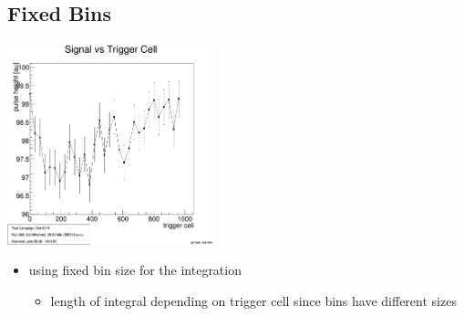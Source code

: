 \documentclass[9pt]{beamer}
\begin{document}
\subsection{Fixed Bins}
\begin{frame}
	\begin{center}
		\includegraphics[width=6cm]{SignalVsTriggerCell}
	\end{center}
	\begin{itemize}
		\item using fixed bin size for the integration
		\begin{itemize}
			\item length of integral depending on trigger cell since bins have different sizes
		\end{itemize}
	\end{itemize}
\end{frame}
\end{document}
